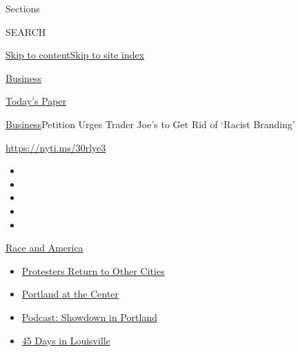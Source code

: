 Sections

SEARCH

\protect\hyperlink{site-content}{Skip to
content}\protect\hyperlink{site-index}{Skip to site index}

\href{https://www.nytimes.com/section/business}{Business}

\href{https://myaccount.nytimes.com/auth/login?response_type=cookie\&client_id=vi}{}

\href{https://www.nytimes.com/section/todayspaper}{Today's Paper}

\href{/section/business}{Business}\textbar{}Petition Urges Trader Joe's
to Get Rid of `Racist Branding'

\url{https://nyti.ms/30rlye3}

\begin{itemize}
\item
\item
\item
\item
\item
\end{itemize}

\href{https://www.nytimes.com/news-event/george-floyd-protests-minneapolis-new-york-los-angeles?action=click\&pgtype=Article\&state=default\&region=TOP_BANNER\&context=storylines_menu}{Race
and America}

\begin{itemize}
\tightlist
\item
  \href{https://www.nytimes.com/2020/07/26/us/protests-portland-seattle-trump.html?action=click\&pgtype=Article\&state=default\&region=TOP_BANNER\&context=storylines_menu}{Protesters
  Return to Other Cities}
\item
  \href{https://www.nytimes.com/2020/07/24/us/portland-oregon-protests-white-race.html?action=click\&pgtype=Article\&state=default\&region=TOP_BANNER\&context=storylines_menu}{Portland
  at the Center}
\item
  \href{https://www.nytimes.com/2020/07/23/podcasts/the-daily/portland-protests.html?action=click\&pgtype=Article\&state=default\&region=TOP_BANNER\&context=storylines_menu}{Podcast:
  Showdown in Portland}
\item
  \href{https://www.nytimes.com/interactive/2020/07/16/us/black-lives-matter-protests-louisville-breonna-taylor.html?action=click\&pgtype=Article\&state=default\&region=TOP_BANNER\&context=storylines_menu}{45
  Days in Louisville}
\end{itemize}

